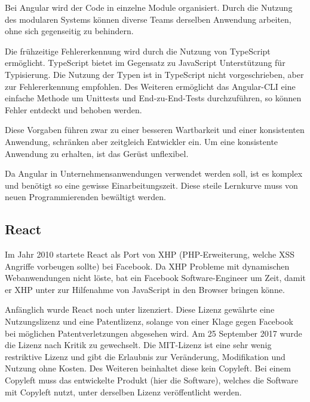 Bei Angular wird der Code in einzelne Module organisiert. Durch die Nutzung des modularen Systems können diverse Teams derselben Anwendung arbeiten, ohne sich gegenseitig zu behindern. \cite{wahlinWesentlichenVorteileAngular2017}

Die frühzeitige Fehlererkennung wird durch die Nutzung von TypeScript ermöglicht. TypeScript bietet im Gegensatz zu JavaScript Unterstützung für Typisierung. Die Nutzung der Typen ist in TypeScript nicht vorgeschrieben, aber zur Fehlererkennung empfohlen.
Des Weiteren ermöglicht das Angular-CLI eine einfache Methode um Unittests und End-zu-End-Tests durchzuführen, so können Fehler entdeckt und behoben werden. \cite{wahlinWesentlichenVorteileAngular2017}

Diese Vorgaben führen zwar zu einer besseren Wartbarkeit und einer konsistenten Anwendung, schränken aber zeitgleich Entwickler ein. Um eine konsistente Anwendung zu erhalten, ist das Gerüst unflexibel.

Da Angular in Unternehmensanwendungen verwendet werden soll, ist es komplex und benötigt so eine gewisse Einarbeitungszeit. Diese steile Lernkurve muss von neuen Programmierenden bewältigt werden. \cite{ventzkemediaAngularVsReact2018}

\subsection{React}
Im Jahr 2010 startete React als Port von XHP (PHP-Erweiterung, welche XSS Angriffe vorbeugen sollte) bei Facebook. Da XHP Probleme mit dynamischen Webanwendungen nicht löste, bat ein Facebook Software-Engineer um Zeit, damit er XHP unter zur Hilfenahme von JavaScript in den Browser bringen könne. \cite{dawsonJavaScriptHistoryHow2014}

Anfänglich wurde React noch unter  lizenziert. Diese Lizenz gewährte eine Nutzungslizenz und eine Patentlizenz, solange von einer Klage gegen Facebook bei möglichen Patentverletzungen abgesehen wird. Am 25 September 2017 wurde die Lizenz nach Kritik zu  gewechselt. \cite{kripalaniIfYouRe2017} \cite{larsonFacebookJustChanged2017} Die MIT-Lizenz ist eine sehr wenig restriktive Lizenz und gibt die Erlaubnis zur Veränderung, Modifikation und Nutzung ohne Kosten. Des Weiteren beinhaltet diese kein Copyleft. Bei einem Copyleft muss das entwickelte Produkt (hier die Software), welches die Software mit Copyleft nutzt, unter derselben Lizenz veröffentlicht werden. \cite{wehnerSoftwareUnterMIT2020}

